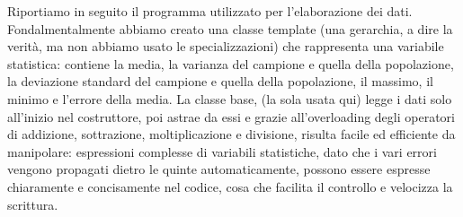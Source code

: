 \documentclass[12pt]{article} %
\begin{document}
	Riportiamo in seguito il programma utilizzato per l'elaborazione dei dati. Fondalmentalmente abbiamo creato una
	classe template (una gerarchia, a dire la verità, ma non abbiamo usato le specializzazioni) che rappresenta
	una variabile statistica: contiene la media, la varianza del campione e quella della popolazione, la deviazione 
	standard del campione e quella della popolazione, il massimo, il minimo e l'errore della media. La classe base, 
	(la sola usata qui) legge i dati solo all'inizio nel costruttore, poi astrae da essi e grazie 
	all'overloading degli operatori di addizione, sottrazione, moltiplicazione e divisione, risulta facile ed efficiente 
	da manipolare: espressioni complesse di variabili statistiche, dato che i vari errori vengono propagati 
	dietro le quinte automaticamente, possono essere espresse chiaramente e concisamente nel codice, cosa che facilita il 
	controllo e velocizza la scrittura.
\end{document}
